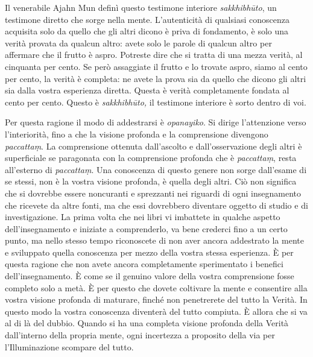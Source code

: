 Il venerabile Ajahn Mun definì questo testimone interiore
\emph{sakkhibhūto}, un testimone diretto che sorge nella mente.
L'autenticità di qualsiasi conoscenza acquisita solo da quello che gli
altri dicono è priva di fondamento, è solo una verità provata da qualcun
altro: avete solo le parole di qualcun altro per affermare che il frutto
è aspro. Potreste dire che si tratta di una mezza verità, al cinquanta
per cento. Se però assaggiate il frutto e lo trovate aspro, siamo al
cento per cento, la verità è completa: ne avete la prova sia da quello
che dicono gli altri sia dalla vostra esperienza diretta. Questa è
verità completamente fondata al cento per cento. Questo è
\emph{sakkhibhūto,} il testimone interiore è sorto dentro di voi.

Per questa ragione il modo di addestrarsi è \emph{opanayiko}. Si dirige
l'attenzione verso l'interiorità, fino a che la visione profonda e la
comprensione divengono \emph{paccattaṃ}. La comprensione ottenuta
dall'ascolto e dall'osservazione degli altri è superficiale se
paragonata con la comprensione profonda che è \emph{paccattaṃ}, resta
all'esterno di \emph{paccattaṃ}. Una conoscenza di questo genere non
sorge dall'esame di se stessi, non è la vostra visione profonda, è
quella degli altri. Ciò non significa che si dovrebbe essere noncuranti
e sprezzanti nei riguardi di ogni insegnamento che ricevete da altre
fonti, ma che essi dovrebbero diventare oggetto di studio e di
investigazione. La prima volta che nei libri vi imbattete in qualche
aspetto dell'insegnamento e iniziate a comprenderlo, va bene crederci
fino a un certo punto, ma nello stesso tempo riconoscete di non aver
ancora addestrato la mente e sviluppato quella conoscenza per mezzo
della vostra stessa esperienza. È per questa ragione che non avete
ancora completamente sperimentato i benefici dell'insegnamento. È come
se il genuino valore della vostra comprensione fosse completo solo a
metà. È per questo che dovete coltivare la mente e consentire alla
vostra visione profonda di maturare, finché non penetrerete del tutto la
Verità. In questo modo la vostra conoscenza diventerà del tutto
compiuta. È allora che si va al di là del dubbio. Quando si ha una
completa visione profonda della Verità dall'interno della propria mente,
ogni incertezza a proposito della via per l'Illuminazione scompare del
tutto.

